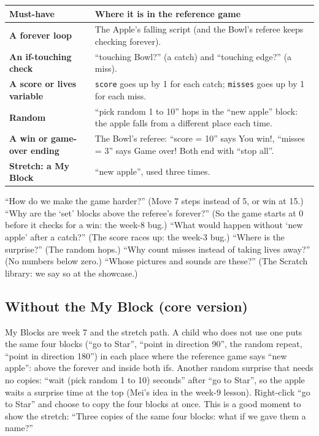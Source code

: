 \documentclass[track=junior,level=2,teacher]{kidscode}
\begin{document}
\begin{center}\small\renewcommand{\arraystretch}{1.3}
\begin{tabularx}{\linewidth}{@{}>{\bfseries}p{4.6cm}X@{}}
\toprule
Must-have & Where it is in the reference game\\
\midrule
A forever loop & The Apple's falling script (and the Bowl's referee keeps checking forever).\\
An if-touching check & \enquote{touching Bowl?} (a catch) and \enquote{touching edge?} (a miss).\\
A score or lives variable & \texttt{score} goes up by 1 for each catch; \texttt{misses} goes up by 1 for each miss.\\
Random & \enquote{pick random 1 to 10} hops in the \enquote{new apple} block: the apple falls from a different place each time.\\
A win or game-over ending & The Bowl's referee: \enquote{score = 10} says You win!, \enquote{misses = 3} says Game over! Both end with \enquote{stop all}.\\
Stretch: a My Block & \enquote{new apple}, used three times.\\
\bottomrule
\end{tabularx}
\end{center}

\begin{tip}
\enquote{How do we make the game harder?} (Move 7 steps instead of 5, or win at 15.)
\enquote{Why are the \enquote{set} blocks above the referee's forever?} (So the game starts at 0 before it checks for a win: the week-8 bug.)
\enquote{What would happen without \enquote{new apple} after a catch?} (The score races up: the week-3 bug.)
\enquote{Where is the surprise?} (The random hops.)
\enquote{Why count misses instead of taking lives away?} (No numbers below zero.)
\enquote{Whose pictures and sounds are these?} (The Scratch library: we say so at the showcase.)
\end{tip}

\subsection{Without the My Block (core version)}
My Blocks are week 7 and the stretch path. A child who does not use one puts the same four blocks
(\enquote{go to Star}, \enquote{point in direction 90}, the random repeat, \enquote{point in direction 180})
in each place where the reference game says \enquote{new apple}: above the forever and inside both ifs.
Another random surprise that needs no copies: \enquote{wait (pick random 1 to 10) seconds} after \enquote{go to Star},
so the apple waits a surprise time at the top (Mei's idea in the week-9 lesson).
Right-click \enquote{go to Star} and choose  to copy the four blocks at once. This is a
good moment to show the stretch: \enquote{Three copies of the same four blocks: what if we gave them a name?}
\end{document}
